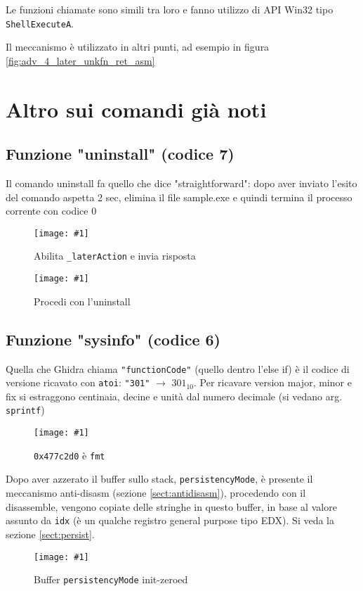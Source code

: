 \documentclass[
    a4paper, %
    11pt %
]{article}
\newcommand{\pic}[4]{\begin{figure}[H]
            \centering
            \texttt{[image: \#1]}
            \caption{#2}
            \label{fig:#1}
            \end{figure}}
\begin{document}
            Le funzioni chiamate sono simili tra loro e fanno utilizzo di API Win32 tipo \texttt{ShellExecuteA}.

            Il meccanismo è utilizzato in altri punti, ad esempio in figura \ref{fig:adv_4_later_unkfn_ret_asm}
            
        \section{Altro sui comandi già noti}

            \subsection{Funzione "uninstall" (codice 7)}

            Il comando uninstall fa quello che dice "straightforward": dopo aver inviato l'esito del comando
            aspetta 2 sec, elimina il file sample.exe e quindi termina il processo corrente con codice 0

            \pic{adv_known_7}{Abilita \texttt{\_laterAction} e invia risposta}{11cm}{4cm}

            \pic{adv_known_7_later}{Procedi con l'uninstall}{15cm}{5cm}

            \subsection{Funzione "sysinfo" (codice 6)}

            Quella che Ghidra chiama \texttt{"functionCode"} (quello dentro l'else if) è il codice di versione ricavato con \texttt{atoi}:
            \texttt{"301"} $\rightarrow$ $301_{10}$. Per ricavare version major, minor e fix si
            estraggono centinaia, decine e unità dal numero decimale (si vedano arg. \texttt{sprintf})

            \pic{adv_known_6_version}{\texttt{0x477c2d0} è \texttt{fmt}}{15cm}{7cm}

            Dopo aver azzerato il buffer sullo stack, \texttt{persistencyMode}, è presente il 
            meccanismo anti-disasm (sezione \ref{sect:antidisasm}), procedendo con il disassemble, vengono
            copiate delle stringhe in questo buffer, in base al valore assunto da \texttt{idx} (è un qualche 
            registro general purpose tipo EDX). Si veda la sezione \ref{sect:persist}.
            
            \pic{adv_known_6_persistencymode}{Buffer \texttt{persistencyMode} init-zeroed}{15cm}{5cm}
\end{document}
